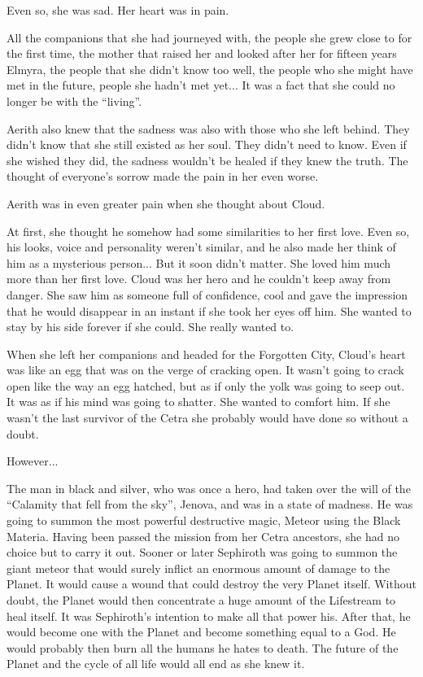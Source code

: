 \documentclass[oneside]{book}
\begin{document}
Even so, she was sad. Her heart was in pain.

All the companions that she had journeyed with, the people she grew close to for the first time, the mother that raised her and looked after her for fifteen years Elmyra, the people that she didn't know too well, the people who she might have met in the future, people she hadn't met yet... It was a fact that she could no longer be with the “living”.

Aerith also knew that the sadness was also with those who she left behind. They didn't know that she still existed as her soul. They didn't need to know. Even if she wished they did, the sadness wouldn't be healed if they knew the truth. The thought of everyone's sorrow made the pain in her even worse.

Aerith was in even greater pain when she thought about Cloud.

At first, she thought he somehow had some similarities to her first love. Even so, his looks, voice and personality weren't similar, and he also made her think of him as a mysterious person... But it soon didn't matter. She loved him much more than her first love. Cloud was her hero and he couldn't keep away from danger. She saw him as someone full of confidence, cool and gave the impression that he would disappear in an instant if she took her eyes off him. She wanted to stay by his side forever if she could. She really wanted to.

When she left her companions and headed for the Forgotten City, Cloud's heart was like an egg that was on the verge of cracking open. It wasn't going to crack open like the way an egg hatched, but as if only the yolk was going to seep out. It was as if his mind was going to shatter. She wanted to comfort him. If she wasn't the last survivor of the Cetra she probably would have done so without a doubt.

However...

The man in black and silver, who was once a hero, had taken over the will of the “Calamity that fell from the sky”, Jenova, and was in a state of madness. He was going to summon the most powerful destructive magic, Meteor using the Black Materia. Having been passed the mission from her Cetra ancestors, she had no choice but to carry it out. Sooner or later Sephiroth was going to summon the giant meteor that would surely inflict an enormous amount of damage to the Planet. It would cause a wound that could destroy the very Planet itself. Without doubt, the Planet would then concentrate a huge amount of the Lifestream to heal itself. It was Sephiroth's intention to make all that power his. After that, he would become one with the Planet and become something equal to a God. He would probably then burn all the humans he hates to death. The future of the Planet and the cycle of all life would all end as she knew it.
\end{document}
